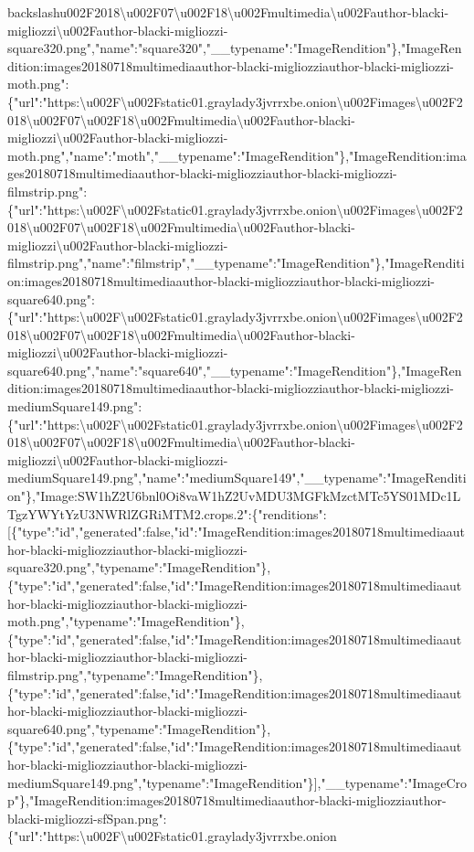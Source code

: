backslash{}u002F2018\textbackslash{}u002F07\textbackslash{}u002F18\textbackslash{}u002Fmultimedia\textbackslash{}u002Fauthor-blacki-migliozzi\textbackslash{}u002Fauthor-blacki-migliozzi-square320.png","name":"square320","\_\_typename":"ImageRendition"\},"ImageRendition:images20180718multimediaauthor-blacki-migliozziauthor-blacki-migliozzi-moth.png":\{"url":"https:\textbackslash{}u002F\textbackslash{}u002Fstatic01.graylady3jvrrxbe.onion\textbackslash{}u002Fimages\textbackslash{}u002F2018\textbackslash{}u002F07\textbackslash{}u002F18\textbackslash{}u002Fmultimedia\textbackslash{}u002Fauthor-blacki-migliozzi\textbackslash{}u002Fauthor-blacki-migliozzi-moth.png","name":"moth","\_\_typename":"ImageRendition"\},"ImageRendition:images20180718multimediaauthor-blacki-migliozziauthor-blacki-migliozzi-filmstrip.png":\{"url":"https:\textbackslash{}u002F\textbackslash{}u002Fstatic01.graylady3jvrrxbe.onion\textbackslash{}u002Fimages\textbackslash{}u002F2018\textbackslash{}u002F07\textbackslash{}u002F18\textbackslash{}u002Fmultimedia\textbackslash{}u002Fauthor-blacki-migliozzi\textbackslash{}u002Fauthor-blacki-migliozzi-filmstrip.png","name":"filmstrip","\_\_typename":"ImageRendition"\},"ImageRendition:images20180718multimediaauthor-blacki-migliozziauthor-blacki-migliozzi-square640.png":\{"url":"https:\textbackslash{}u002F\textbackslash{}u002Fstatic01.graylady3jvrrxbe.onion\textbackslash{}u002Fimages\textbackslash{}u002F2018\textbackslash{}u002F07\textbackslash{}u002F18\textbackslash{}u002Fmultimedia\textbackslash{}u002Fauthor-blacki-migliozzi\textbackslash{}u002Fauthor-blacki-migliozzi-square640.png","name":"square640","\_\_typename":"ImageRendition"\},"ImageRendition:images20180718multimediaauthor-blacki-migliozziauthor-blacki-migliozzi-mediumSquare149.png":\{"url":"https:\textbackslash{}u002F\textbackslash{}u002Fstatic01.graylady3jvrrxbe.onion\textbackslash{}u002Fimages\textbackslash{}u002F2018\textbackslash{}u002F07\textbackslash{}u002F18\textbackslash{}u002Fmultimedia\textbackslash{}u002Fauthor-blacki-migliozzi\textbackslash{}u002Fauthor-blacki-migliozzi-mediumSquare149.png","name":"mediumSquare149","\_\_typename":"ImageRendition"\},"Image:SW1hZ2U6bnl0Oi8vaW1hZ2UvMDU3MGFkMzctMTc5YS01MDc1LTgzYWYtYzU3NWRlZGRiMTM2.crops.2":\{"renditions":{[}\{"type":"id","generated":false,"id":"ImageRendition:images20180718multimediaauthor-blacki-migliozziauthor-blacki-migliozzi-square320.png","typename":"ImageRendition"\},\{"type":"id","generated":false,"id":"ImageRendition:images20180718multimediaauthor-blacki-migliozziauthor-blacki-migliozzi-moth.png","typename":"ImageRendition"\},\{"type":"id","generated":false,"id":"ImageRendition:images20180718multimediaauthor-blacki-migliozziauthor-blacki-migliozzi-filmstrip.png","typename":"ImageRendition"\},\{"type":"id","generated":false,"id":"ImageRendition:images20180718multimediaauthor-blacki-migliozziauthor-blacki-migliozzi-square640.png","typename":"ImageRendition"\},\{"type":"id","generated":false,"id":"ImageRendition:images20180718multimediaauthor-blacki-migliozziauthor-blacki-migliozzi-mediumSquare149.png","typename":"ImageRendition"\}{]},"\_\_typename":"ImageCrop"\},"ImageRendition:images20180718multimediaauthor-blacki-migliozziauthor-blacki-migliozzi-sfSpan.png":\{"url":"https:\textbackslash{}u002F\textbackslash{}u002Fstatic01.graylady3jvrrxbe.onion\te